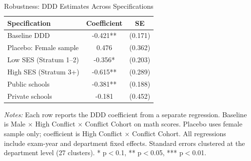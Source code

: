 \begin{table}[htbp]
\centering
\caption{Robustness: DDD Estimates Across Specifications}
\label{tab:robustness}
\begin{tabular}{lcc}
\hline\hline
Specification & Coefficient & SE \\
\hline
Baseline DDD & -0.421** & (0.171) \\[3pt]
Placebo: Female sample & 0.476 & (0.362) \\[3pt]
Low SES (Stratum 1--2) & -0.356* & (0.203) \\
High SES (Stratum 3+) & -0.615** & (0.289) \\
Public schools & -0.381** & (0.188) \\
Private schools & -0.181 & (0.452) \\
\hline\hline
\end{tabular}
\begin{flushleft}\small
\textit{Notes:} Each row reports the DDD coefficient from a separate regression. Baseline is Male $\times$ High Conflict $\times$ Conflict Cohort on math scores. Placebo uses female sample only; coefficient is High Conflict $\times$ Conflict Cohort. All regressions include exam-year and department fixed effects. Standard errors clustered at the department level (27 clusters). * p$<$0.1, ** p$<$0.05, *** p$<$0.01.
\end{flushleft}
\end{table}
